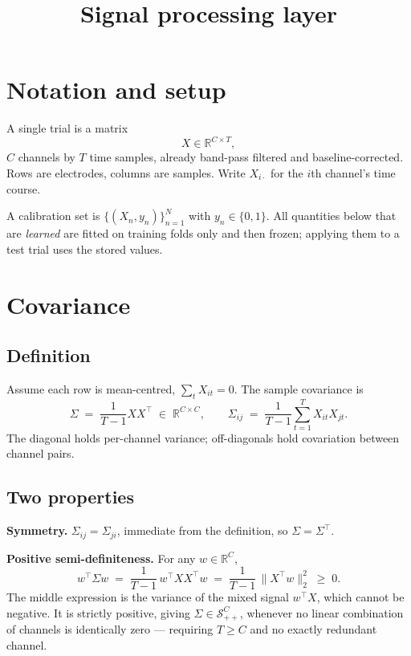 \documentclass[11pt]{article}
\title{Signal processing layer}
\author{}
\date{}
\newcommand{\Real}{\mathbb{R}}
\newcommand{\SPD}[1]{\mathcal{S}^{#1}_{++}}
\begin{document}
\maketitle
\vspace{-3em}

\section{Notation and setup}

A single trial is a matrix
\[
X \in \Real^{C \times T},
\]
$C$ channels by $T$ time samples, already band-pass filtered and
baseline-corrected. Rows are electrodes, columns are samples. Write
$X_{i\cdot}$ for the $i$th channel's time course.

A calibration set is $\{(X_n, y_n)\}_{n=1}^{N}$ with $y_n \in \{0,1\}$.
All quantities below that are \emph{learned} are fitted on training
folds only and then frozen; applying them to a test trial uses the
stored values.

\section{Covariance}

\subsection{Definition}

Assume each row is mean-centred, $\sum_t X_{it} = 0$. The sample
covariance is
\[
\Sigma \;=\; \frac{1}{T-1} X X^\top \;\in\; \Real^{C \times C},
\qquad
\Sigma_{ij} \;=\; \frac{1}{T-1}\sum_{t=1}^{T} X_{it} X_{jt}.
\]
The diagonal holds per-channel variance; off-diagonals hold covariation
between channel pairs.

\subsection{Two properties}

\textbf{Symmetry.} $\Sigma_{ij} = \Sigma_{ji}$, immediate from the
definition, so $\Sigma = \Sigma^\top$.

\textbf{Positive semi-definiteness.} For any $w \in \Real^C$,
\[
w^\top \Sigma w \;=\; \frac{1}{T-1}\, w^\top X X^\top w
\;=\; \frac{1}{T-1}\,\big\| X^\top w \big\|_2^2 \;\ge\; 0 .
\]
The middle expression is the variance of the mixed signal $w^\top X$,
which cannot be negative. It is strictly positive, giving
$\Sigma \in \SPD{C}$, whenever no linear combination of channels is
identically zero --- requiring $T \ge C$ and no exactly redundant
channel.
\end{document}
